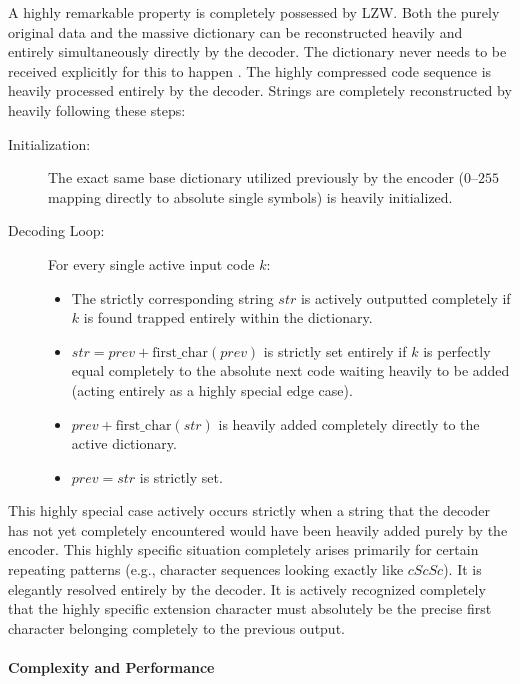 A highly remarkable property is completely possessed by LZW. Both the purely original data and the massive dictionary can be reconstructed heavily and entirely simultaneously directly by the decoder. The dictionary never needs to be received explicitly for this to happen \cite{Welch1984}. The highly compressed code sequence is heavily processed entirely by the decoder. Strings are completely reconstructed by heavily following these steps:
 \cite{Salomon1997}
\begin{description}
    \item[Initialization:] The exact same base dictionary utilized previously by the encoder ($0$--$255$ mapping directly to absolute single symbols) is heavily initialized.
    \item[Decoding Loop:] For every single active input code $k$:
    \begin{itemize}
        \item The strictly corresponding string $str$ is actively outputted completely if $k$ is found trapped entirely within the dictionary.
        \item $str = prev + \text{first\_char}(prev)$ is strictly set entirely if $k$ is perfectly equal completely to the absolute next code waiting heavily to be added (acting entirely as a highly special edge case).
        \item $prev + \text{first\_char}(str)$ is heavily added completely directly to the active dictionary.
        \item $prev = str$ is strictly set.
    \end{itemize}
\end{description}

This highly special case actively occurs strictly when a string that the decoder has not yet completely encountered would have been heavily added purely by the encoder. This highly specific situation completely arises primarily for certain repeating patterns (e.g., character sequences looking exactly like $cScSc$). It is elegantly resolved entirely by the decoder. It is actively recognized completely that the highly specific extension character must absolutely be the precise first character belonging completely to the previous output.

\paragraph{Complexity and Performance}\mbox{}\\

